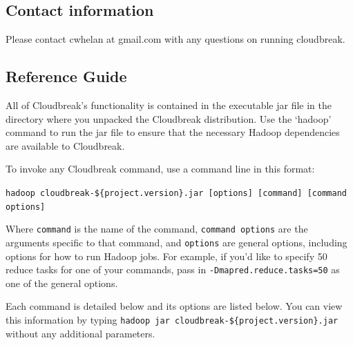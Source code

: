 \documentclass[11pt]{article}
\begin{document}
\subsection{Contact information}
\label{contactinformation}

Please contact cwhelan at gmail.com with any questions on running cloudbreak.

\subsection{Reference Guide}
\label{referenceguide}

All of Cloudbreak's functionality is contained in the executable jar file in the
directory where you unpacked the Cloudbreak distribution. Use the `hadoop'
command to run the jar file to ensure that the necessary Hadoop dependencies
are available to Cloudbreak.

To invoke any Cloudbreak command, use a command line in this format:

\texttt{hadoop cloudbreak-\$\{project.version\}.jar [options] [command] [command options]}

Where \texttt{command} is the name of the command, \texttt{command options} are the arguments specific
to that command, and \texttt{options} are general options, including options for how to run
Hadoop jobs. For example, if you'd like to specify 50 reduce tasks
for one of your commands, pass in \texttt{-Dmapred.reduce.tasks=50} as one of the general options. 

Each command is detailed below and its options are listed below. You can view this information by typing
\texttt{hadoop jar cloudbreak-\$\{project.version\}.jar} without any additional parameters.
\end{document}
